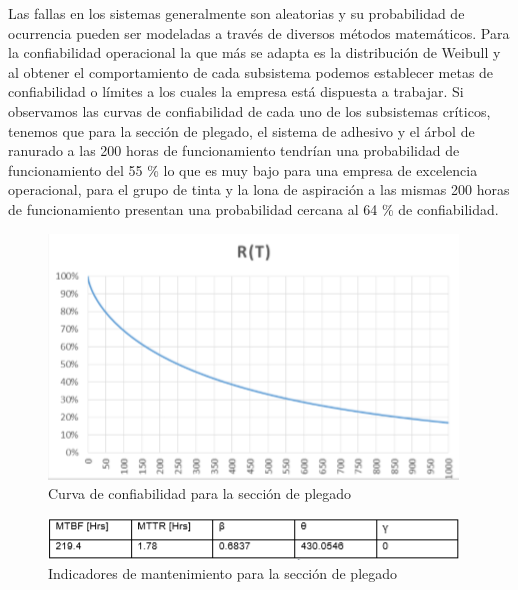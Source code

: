 \begin{description}
Las fallas en los sistemas generalmente son aleatorias y su probabilidad de ocurrencia pueden ser modeladas a través de diversos métodos matemáticos. Para la confiabilidad operacional la que más se adapta es la distribución de Weibull y al obtener el comportamiento de cada subsistema podemos establecer metas de confiabilidad o límites a los cuales la empresa está dispuesta a trabajar. Si observamos las curvas de confiabilidad de cada uno de los subsistemas críticos, tenemos que para la sección de plegado, el sistema de adhesivo y el árbol de ranurado a las 200 horas de funcionamiento tendrían una probabilidad de funcionamiento del 55 \% lo que es muy bajo para una empresa de excelencia operacional, para el grupo de tinta y la lona de aspiración a las mismas 200 horas de funcionamiento presentan una probabilidad cercana al 64 \% de confiabilidad.  

\begin{figure}[H]
\centering
\includegraphics[scale=0.8]{images/plegadoraconf.png}
\caption{Curva de confiabilidad para la sección de plegado \citep{cruz2018}}
\end{figure}

\begin{figure}[H]
\centering
\includegraphics[scale=0.9]{images/plegadoraind.png}
\caption{Indicadores de mantenimiento para la sección de plegado \citep{cruz2018}}
\end{figure}

\end{description}


